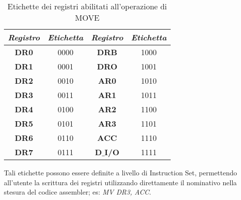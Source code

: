 \begin{table}[H]
	\centering
	\fontsize{10}{18}\selectfont
	\begin{tabular}{|p{25mm}|p{25mm}|p{25mm}|p{25mm}|}
		\hline
		\multicolumn{1}{|c|}{\textit{Registro}} &
		\multicolumn{1}{c|}{\textit{Etichetta}} &
		\multicolumn{1}{|c|}{\textit{Registro}} &
		\multicolumn{1}{c|}{\textit{Etichetta}}\\
		
		\hline
		\multicolumn{1}{|c|}{\textbf{DR0}} &
		\multicolumn{1}{c|}{0000} &
		\multicolumn{1}{|c|}{\textbf{DRB}} &
		\multicolumn{1}{c|}{1000}\\
		
		\hline
		\multicolumn{1}{|c|}{\textbf{DR1}} &
		\multicolumn{1}{c|}{0001} &
		\multicolumn{1}{|c|}{\textbf{DRO}} &
		\multicolumn{1}{c|}{1001}\\
		
		\hline
		\multicolumn{1}{|c|}{\textbf{DR2}} &
		\multicolumn{1}{c|}{0010} &
		\multicolumn{1}{|c|}{\textbf{AR0}} &
		\multicolumn{1}{c|}{1010}\\
		
		\hline
		\multicolumn{1}{|c|}{\textbf{DR3}} &
		\multicolumn{1}{c|}{0011} &
		\multicolumn{1}{|c|}{\textbf{AR1}} &
		\multicolumn{1}{c|}{1011}\\
		
		\hline
		\multicolumn{1}{|c|}{\textbf{DR4}} &
		\multicolumn{1}{c|}{0100} &
		\multicolumn{1}{|c|}{\textbf{AR2}} &
		\multicolumn{1}{c|}{1100}\\
		
		\hline
		\multicolumn{1}{|c|}{\textbf{DR5}} &
		\multicolumn{1}{c|}{0101} &
		\multicolumn{1}{|c|}{\textbf{AR3}} &
		\multicolumn{1}{c|}{1101}\\
		
		\hline
		\multicolumn{1}{|c|}{\textbf{DR6}} &
		\multicolumn{1}{c|}{0110} &
		\multicolumn{1}{|c|}{\textbf{ACC}} &
		\multicolumn{1}{c|}{1110}\\
		
		\hline
		\multicolumn{1}{|c|}{\textbf{DR7}} &
		\multicolumn{1}{c|}{0111} &
		\multicolumn{1}{|c|}{\textbf{D$\_$I/O}} &
		\multicolumn{1}{c|}{1111}\\
		
		\hline
	\end{tabular}
	\caption{Etichette dei registri abilitati all'operazione di MOVE}
\end{table}
\noindent
Tali etichette possono essere definite a livello di Instruction Set, permettendo all'utente la scrittura dei registri utilizzando direttamente il nominativo nella stesura del codice assembler; es: \textit{MV DR3, ACC}.\\
